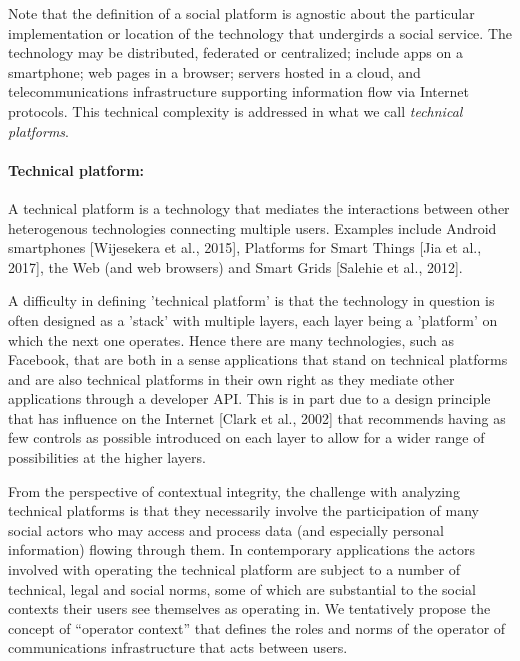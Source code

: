 \documentclass[../thesis.tex]{subfiles}
\begin{document}
Note that the definition of a social platform is agnostic about the
particular implementation or location of the technology that undergirds
a social service. The technology may be distributed, federated or
centralized; include apps on a smartphone; web pages in a browser;
servers hosted in a {\textquotedbl}cloud{\textquotedbl}, and
telecommunications infrastructure supporting information flow via
Internet protocols. This technical complexity is addressed in what we
call \textit{technical platforms}.



\paragraph{Technical platform:} A technical platform is a technology that
mediates the interactions between other heterogenous technologies
connecting multiple users. Examples include Android smartphones
[Wijesekera et al., 2015], Platforms for Smart Things [Jia et al.,
2017], the Web (and web browsers) and Smart Grids [Salehie et al.,
2012].

A difficulty in defining 'technical
platform' is that the technology in question is often
designed as a 'stack' with multiple
layers, each layer being a 'platform'
on which the next one operates. Hence there are many technologies, such
as Facebook, that are both in a sense
{\textquotedbl}applications{\textquotedbl} that stand on technical
platforms and are also technical platforms in their own right as they
mediate other applications through a developer API. This is in part due
to a design principle that has influence on the Internet [Clark et al.,
2002] that recommends having as few controls as possible introduced on
each layer to allow for a wider range of possibilities at the higher
layers.

From the perspective of contextual integrity, the challenge with
analyzing technical platforms is that they necessarily involve the
participation of many social actors who may access and process data
(and especially personal information) flowing through them. In
contemporary applications the actors involved with operating the
technical platform are subject to a number of technical, legal and
social norms, some of which are substantial to the social contexts
their users see themselves as operating in. We tentatively propose the
concept of ``operator context'' that defines
the roles and norms of the operator of communications infrastructure
that acts between users. 
\end{document}
